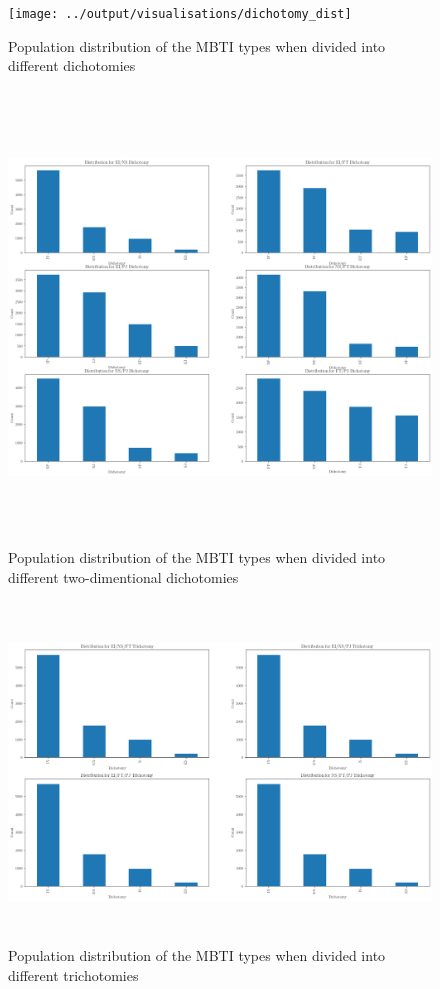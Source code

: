 \documentclass[11pt,a4paper]{article}
\begin{document}
		\begin{figure}[h!]
		\centering
		
		\texttt{[image: ../output/visualisations/dichotomy\_dist]}
		
		\caption{Population distribution of the MBTI types when divided into different dichotomies}
		
	\end{figure}

	\begin{figure}[h!]
		\centering
		
		\includegraphics[height=12cm]{../output/visualisations/dichotomy_dist_2}
		
		\caption{Population distribution of the MBTI types when divided into different two-dimentional dichotomies}
		
	\end{figure}

	\begin{figure}[h!]
		\centering
		
		\includegraphics[height=9cm]{../output/visualisations/trichotomy_dist}
		
		\caption{Population distribution of the MBTI types when divided into different trichotomies}
		
	\end{figure}
\end{document}
